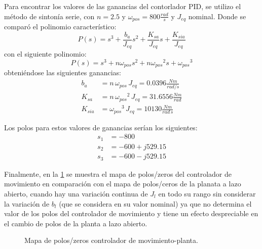 \documentclass[a4paper, 10pt, onecolumn,journal]{ieeeconf}
\begin{document}
Para encontrar los valores de las ganancias del contorlador PID, se utilizo el método de sintonía serie, con $n=2.5$ y $\omega_{pos}=800\frac{rad}{s}$ y $J_{eq}$ nominal. Donde se comparó el polinomio característico:
\begin{equation}
	P(s) =  s^3 + \frac{b_a}{J_{eq}} s^2 + \frac{K_{sa}}{J_{eq}} s + \frac{K_{sia}}{J_{eq}} 
\end{equation}
con el siguiente polinomio:
\begin{equation}
	P(s) =  s^3 + n \omega_{pos} s^2 + n {\omega_{pos}}^2 s + {\omega_{pos}}^3 
\end{equation}
obteniéndose las siguientes ganancias:
\begin{align}
	b_a &=  n \, \omega_{pos} \, J_{eq}= 0.0396 \frac{Nm}{rad/s} \\
	K_{sa} &=  n \, {\omega_{pos}}^2 \, J_{eq}= 31.6556 \frac{Nm}{rad}\\
	K_{sia} &= {\omega_{pos}}^3 \, J_{eq}= 10130 \frac{Nm}{rad \, s}
\end{align}

Los polos para estos valores de ganancias serían los siguientes:
\begin{align}
	s_1 &= -800 \\
	s_2 &=  -600 + j 529.15\\
	s_3 &=  -600 - j 529.15
\end{align}

Finalmente, en la \cref{mapa de polos-ceros controlador-planta} se muestra el mapa de polos/zeros del controlador de movimiento
en comparación con el mapa de polos/ceros de la planata a lazo abierto, cuando hay una variación continua de $J_l$ en todo su rango
sin considerar la variación de $b_l$ (que se considera en su valor nominal) ya que no determina el valor de los polos del controlador de movimiento y tiene un 
efecto despreciable en el cambio de polos de la planta a lazo abierto.

\begin{figure}[H]
	\centering
	\begin{adjustbox}{max width=\columnwidth}
	\end{adjustbox}
	\caption{Mapa de polos/zeros controlador de movimiento-planta.}
	\label{mapa de polos-ceros controlador-planta}
\end{figure}
\end{document}
